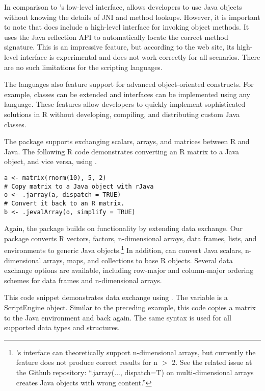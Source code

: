 In comparison to 's low-level interface,  allows developers to use Java objects without knowing the details of JNI and method lookups. However, it is important to note that  does include a high-level interface for invoking object methods. It uses the Java reflection API to automatically locate the correct method signature. This is an impressive feature, but according to the  web site, its high-level interface is experimental and does not work correctly for all scenarios. There are no such limitations for the  scripting languages.

The  languages also feature support for advanced object-oriented constructs. For example, classes can be extended and interfaces can be implemented using any language. These features allow developers to quickly implement sophisticated solutions in R without developing, compiling, and distributing custom Java classes.

The  package supports exchanging scalars, arrays, and matrices between R and Java. The following R code demonstrates converting an R matrix to a Java object, and vice versa, using .

\begin{verbatim}
a <- matrix(rnorm(10), 5, 2)
# Copy matrix to a Java object with rJava
o <- .jarray(a, dispatch = TRUE)
# Convert it back to an R matrix.
b <- .jevalArray(o, simplify = TRUE)
\end{verbatim}

Again, the  package builds on  functionality by extending data exchange. Our package converts R vectors, factors, n-dimensional arrays, data frames, lists, and environments to generic Java objects.\footnote{'s interface can theoretically support n-dimensional arrays, but currently the feature does not produce correct results for n $>$ 2. See the related issue at the  Github repository: ``.jarray(..., dispatch=T) on multi-dimensional arrays creates Java objects with wrong content.''} In addition,  can convert Java scalars, n-dimensional arrays, maps, and collections to base R objects. Several data exchange options are available, including row-major and column-major ordering schemes for data frames and n-dimensional arrays.

This code snippet demonstrates data exchange using . The variable  is a  ScriptEngine object. Similar to the preceding  example, this code copies a matrix to the Java environment and back again. The same syntax is used for all supported data types and structures.

